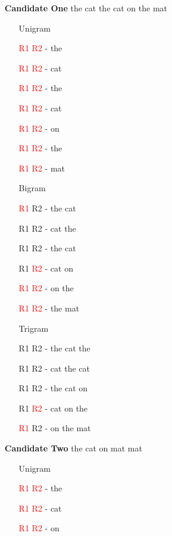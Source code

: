 \begin{multicols}{2}
\begin{itemize}
		\setlength\itemsep{.001em}
	\item	[\textbf{Candidate One}] the cat the cat on the mat
		\begin{itemize}
		\setlength\itemsep{.001em}
			\item [Unigram]
			\item[\textcolor{red}{R1} \textcolor{red}{R2} -]	the 
			\item[\textcolor{red}{R1} \textcolor{red}{R2} -]	cat 
			\item[\textcolor{red}{R1} \textcolor{red}{R2} -]	the 
			\item[\textcolor{red}{R1} \textcolor{red}{R2} -]	cat 
			\item[\textcolor{red}{R1} \textcolor{red}{R2} -]	on 
			\item[\textcolor{red}{R1} \textcolor{red}{R2} -]	the 
			\item[\textcolor{red}{R1} \textcolor{red}{R2} -]	mat
			\item [Bigram]
			\item[\textcolor{red}{R1} R2 -]	the cat 
			\item[R1 R2 -]	cat the 
			\item[R1 R2 -]	the cat 
			\item[R1 \textcolor{red}{R2} -]	cat on 
			\item[\textcolor{red}{R1} \textcolor{red}{R2} -]	on the 
			\item[\textcolor{red}{R1} \textcolor{red}{R2} -]	the mat
			\item [Trigram] 
			\item[R1 R2 -]	the cat the
			\item[R1 R2 -]	cat the cat
			\item[R1 R2 -]	the cat on
			\item[R1 \textcolor{red}{R2} -]	cat on the
			\item[\textcolor{red}{R1} R2 -]	on the mat
		\end{itemize}
	\item	[\textbf{Candidate Two}] the cat on mat mat
		\begin{itemize}
		\setlength\itemsep{.001em}
			\item [Unigram]
			\item[\textcolor{red}{R1} \textcolor{red}{R2} -]	the 
			\item[\textcolor{red}{R1} \textcolor{red}{R2} -]	cat 
			\item[\textcolor{red}{R1} \textcolor{red}{R2} -]	on 

\end{itemize}
\end{itemize}
\end{multicols}
